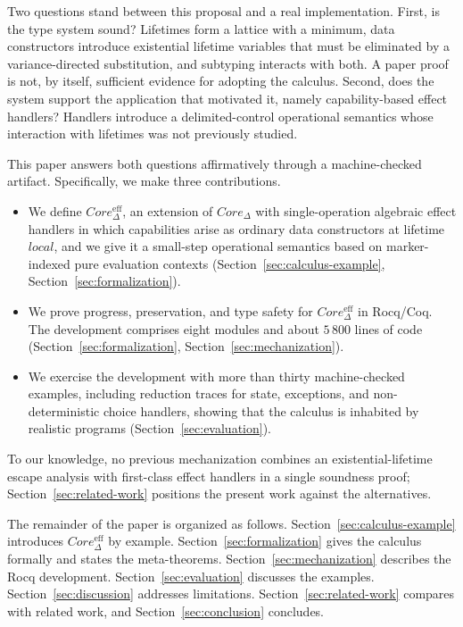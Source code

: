 \documentclass[12pt,a4paper]{article}
\begin{document}
    Two questions stand between this proposal and a real implementation.
    First, is the type system sound?
    Lifetimes form a lattice with a minimum, data constructors introduce existential
    lifetime variables that must be eliminated by a variance-directed substitution,
    and subtyping interacts with both.
    A paper proof is not, by itself, sufficient evidence for adopting the calculus.
    Second, does the system support the application that motivated it, namely
    capability-based effect handlers?
    Handlers introduce a delimited-control operational semantics whose interaction
    with lifetimes was not previously studied.

    This paper answers both questions affirmatively through a machine-checked
    artifact.
    Specifically, we make three contributions.

    \begin{itemize}
        \item We define $Core_\Delta^{\mathrm{eff}}$, an extension of $Core_\Delta$
            with single-operation algebraic effect handlers in which capabilities
            arise as ordinary data constructors at lifetime $local$, and we give
            it a small-step operational semantics based on marker-indexed pure
            evaluation contexts (Section~\ref{sec:calculus-example},
            Section~\ref{sec:formalization}).
        \item We prove progress, preservation, and type safety for
            $Core_\Delta^{\mathrm{eff}}$ in Rocq/Coq.
            The development comprises eight modules and about $5\,800$ lines
            of code (Section~\ref{sec:formalization},
            Section~\ref{sec:mechanization}).
        \item We exercise the development with more than thirty
            machine-checked examples, including reduction traces for state,
            exceptions, and non-deterministic choice handlers, showing that the
            calculus is inhabited by realistic programs
            (Section~\ref{sec:evaluation}).
    \end{itemize}

    To our knowledge, no previous mechanization combines an
    existential-lifetime escape analysis with first-class effect handlers in a
    single soundness proof; Section~\ref{sec:related-work} positions the present
    work against the alternatives.

    The remainder of the paper is organized as follows.
    Section~\ref{sec:calculus-example} introduces $Core_\Delta^{\mathrm{eff}}$ by
    example.
    Section~\ref{sec:formalization} gives the calculus formally and states the
    meta-theorems.
    Section~\ref{sec:mechanization} describes the Rocq development.
    Section~\ref{sec:evaluation} discusses the examples.
    Section~\ref{sec:discussion} addresses limitations.
    Section~\ref{sec:related-work} compares with related work, and
    Section~\ref{sec:conclusion} concludes.
\end{document}
